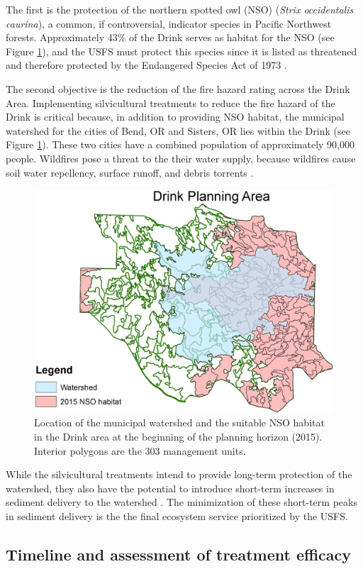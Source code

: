 The first is the protection of the northern spotted owl (NSO) (\textit{Strix occidentalis caurina}), a common, if controversial, indicator species in Pacific Northwest forests. Approximately 43\% of the Drink serves as habitat for the NSO (see Figure \ref{fig:drinkOwlAndWatershed}), and the USFS must protect this species since it is listed as threatened and therefore protected by the Endangered Species Act of 1973 \cite{congress1973endangered}.

The second objective is the reduction of the fire hazard rating across the Drink Area. Implementing silvicultural treatments to reduce the fire hazard of the Drink is critical because, in addition to providing NSO habitat, the municipal watershed for the cities of Bend, OR and Sisters, OR lies within the Drink (see Figure \ref{fig:drinkOwlAndWatershed}). These two cities have a combined population of approximately 90,000 people. Wildfires pose a threat to the their water supply, because wildfires cause soil water repellency, surface runoff, and debris torrents \cite{ice2004effects}.

\begin{figure}
\centering
\includegraphics[width=.5\textwidth]{../images/DrinkMap_NSOAndWatershed}
\caption[NSO Habitat and municipal watershed in the Drink Planning Area]{Location of the municipal watershed and the suitable NSO habitat in the Drink area at the beginning of the planning horizon (2015). Interior polygons are the 303 management units.}
\label{fig:drinkOwlAndWatershed}
\end{figure}

While the silvicultural treatments intend to provide long-term protection of the watershed, they also have the potential to introduce short-term increases in sediment delivery to the watershed \cite{o2005conceptual}. The minimization of these short-term peaks in sediment delivery is the the final ecosystem service prioritized by the USFS.

\subsection{Timeline and assessment of treatment efficacy}

